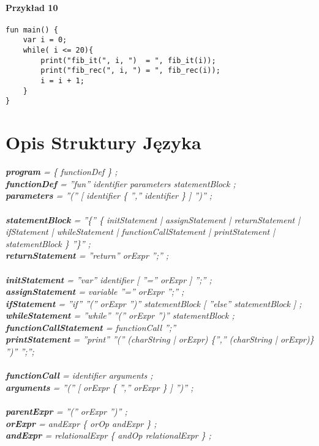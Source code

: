 \documentclass[11pt]{article} %
\begin{document}
\paragraph{Przykład 10}
\begin{verbatim}
fun main() {
    var i = 0;
    while( i <= 20){
        print("fib_it(", i, ")  = ", fib_it(i));
        print("fib_rec(", i, ") = ", fib_rec(i));
        i = i + 1;
    }
}
\end{verbatim}
\section{Opis Struktury Języka}

\textsl{\textbf{program} = \{ functionDef \} ;\\
\textbf{functionDef} = ''fun'' identifier parameters statementBlock ;\\
\textbf{parameters} = ''('' [ identifier \{ '','' identifier \} ] '')'' ;\\
\\
\textbf{statementBlock} = ''\{'' \{ initStatement | assignStatement | returnStatement |
ifStatement | whileStatement | functionCallStatement |  printStatement | statementBlock \} ''\}'' ;\\
\textbf{returnStatement} = ''return'' orExpr '';'' ;\\
\\
\textbf{initStatement} = ''var'' identifier [ ''='' orExpr ] '';'' ;\\
\textbf{assignStatement} = variable ''='' orExpr '';'' ;\\
\textbf{ifStatement} = ''if'' ''('' orExpr '')'' statementBlock [ ''else'' statementBlock ] ;\\
\textbf{whileStatement} = ''while'' ''('' orExpr '')'' statementBlock ;\\
\textbf{functionCallStatement} =  functionCall '';''\\
\textbf{printStatement} = ''print'' ''('' (charString | orExpr) \{'','' (charString | orExpr)\} '')'' '';'';\\
\\
\textbf{functionCall} = identifier arguments ;\\
\textbf{arguments} = ''('' [ orExpr \{ '','' orExpr \} ] '')'' ;\\
\\
\textbf{parentExpr} = ''('' orExpr '')'' ;\\
\textbf{orExpr} = andExpr \{ orOp andExpr \} ;\\
\textbf{andExpr} = relationalExpr \{ andOp relationalExpr \} ;\\
}
\end{document}
